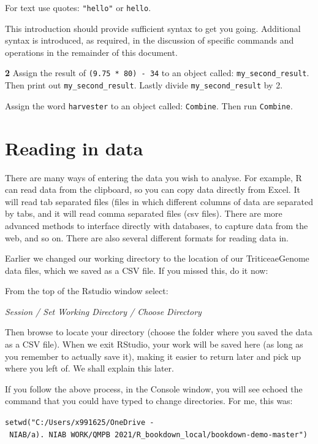 \documentclass[
]{book}
\makeatletter
\newenvironment{kframe}{%
\medskip{}
\setlength{\fboxsep}{.8em}
 \def\at@end@of@kframe{}%
 \ifinner\ifhmode%
  \def\at@end@of@kframe{\end{minipage}}%
  \begin{minipage}{\columnwidth}%
 \fi\fi%
 \def\FrameCommand##1{\hskip\@totalleftmargin \hskip-\fboxsep
 \colorbox{shadecolor}{##1}\hskip-\fboxsep
     \hskip-\linewidth \hskip-\@totalleftmargin \hskip\columnwidth}%
 \MakeFramed {\advance\hsize-\width
   \@totalleftmargin\z@ \linewidth\hsize
   \@setminipage}}%
 {\par\unskip\endMakeFramed%
 \at@end@of@kframe}
\newenvironment{rmdblock}[1]
  {
  \begin{itemize}
  \renewcommand{\labelitemi}{
    \raisebox{-.7\height}[0pt][0pt]{
      {\setkeys{Gin}{width=3em,keepaspectratio}\texttt{[image: images/\#1]}}
    }
  }
  \setlength{\fboxsep}{1em}
  \begin{kframe}
  \item
  }
  {
  \end{kframe}
  \end{itemize}
  }
\newenvironment{rmdquiz}
  {\begin{rmdblock}{quiz}}
  {\end{rmdblock}}
\makeatother
\begin{document}
For text use quotes: \texttt{"hello"} or \texttt{\textquotesingle{}hello\textquotesingle{}}.

This introduction should provide sufficient syntax to get you going. Additional syntax is introduced, as required, in the discussion of specific commands and operations in the remainder of this document.

\begin{rmdquiz}
\textbf{2} Assign the result of \texttt{(9.75\ *\ 80)\ -\ 34} to an object called: \texttt{my\_second\_result}. Then print out \texttt{my\_second\_result}. Lastly divide \texttt{my\_second\_result} by 2.

Assign the word \texttt{harvester} to an object called: \texttt{Combine}. Then run \texttt{Combine}.
\end{rmdquiz}

\hypertarget{reading-in-data}{%
\section{Reading in data}\label{reading-in-data}}

There are many ways of entering the data you wish to analyse. For example, R can read data from the clipboard, so you can copy data directly from Excel. It will read tab separated files (files in which different columns of data are separated by tabs, and it will read comma separated files (csv files). There are more advanced methods to interface directly with databases, to capture data from the web, and so on. There are also several different formats for reading data in.

Earlier we changed our working directory to the location of our TriticeaeGenome data files, which we saved as a CSV file. If you missed this, do it now:

From the top of the Rstudio window select:

\emph{Session / Set Working Directory / Choose Directory}

Then browse to locate your directory (choose the folder where you saved the data as a CSV file). When we exit RStudio, your work will be saved here (as long as you remember to actually save it), making it easier to return later and pick up where you left of. We shall explain this later.

If you follow the above process, in the Console window, you will see echoed the command that you could have typed to change directories. For me, this was:

\texttt{setwd("C:/Users/x991625/OneDrive\ -\ NIAB/a).\ NIAB\ WORK/QMPB\ 2021/R\_bookdown\_local/bookdown-demo-master")}
\end{document}

